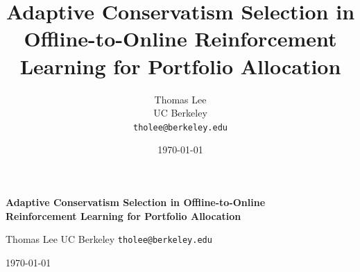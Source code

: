\documentclass{article}
\title{Adaptive Conservatism Selection in Offline-to-Online Reinforcement
       Learning for Portfolio Allocation}
\author{Thomas Lee \\
        UC Berkeley \\
        \texttt{tholee@berkeley.edu}}
\date{\today}
\begin{document}
\begingroup
  \centering
  {\Large\bfseries Adaptive Conservatism Selection in Offline-to-Online \\
   Reinforcement Learning for Portfolio Allocation\par}
  \vspace{0.5em}
  {Thomas Lee \quad UC Berkeley \quad
   \texttt{tholee@berkeley.edu}\par}
  \vspace{0.5em}
  {\small\today\par}
\endgroup
\vspace{1em}










\end{document}
